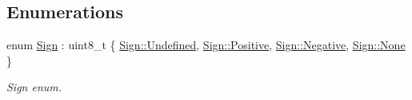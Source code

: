 \subsection*{Enumerations}
\begin{DoxyCompactItemize}
\item 
enum \hyperlink{namespacelibrary_1_1core_1_1types_a06d9eaa410d43a0fa3f383040618e87d}{Sign} \+: uint8\+\_\+t \{ \hyperlink{namespacelibrary_1_1core_1_1types_a06d9eaa410d43a0fa3f383040618e87daec0fc0100c4fc1ce4eea230c3dc10360}{Sign\+::\+Undefined}, 
\hyperlink{namespacelibrary_1_1core_1_1types_a06d9eaa410d43a0fa3f383040618e87da3289297424e01eda5b788c083bbf3147}{Sign\+::\+Positive}, 
\hyperlink{namespacelibrary_1_1core_1_1types_a06d9eaa410d43a0fa3f383040618e87daffb9356ff2b7da85c75c92fa7ea03b8b}{Sign\+::\+Negative}, 
\hyperlink{namespacelibrary_1_1core_1_1types_a06d9eaa410d43a0fa3f383040618e87da6adf97f83acf6453d4a6a4b1070f3754}{Sign\+::\+None}
 \}\begin{DoxyCompactList}\small\item\em Sign enum. \end{DoxyCompactList}
\end{DoxyCompactItemize}
